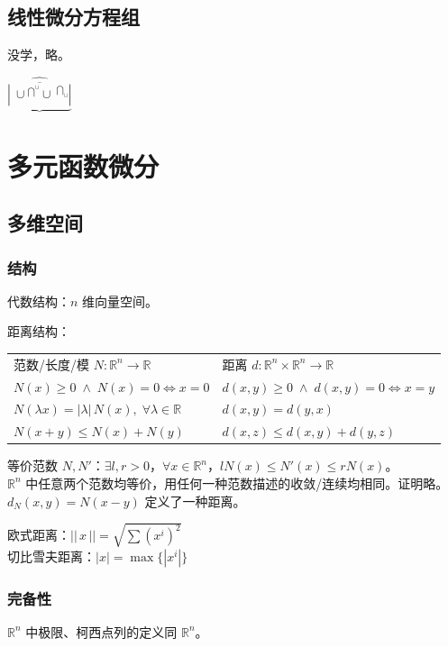 \documentclass[12pt, a4paper, UTF8, openany]{ctexbook}
\newcommand{\field}[1]{\mathbb{#1}}%
\newcommand{\R}[1]{\field{R}^{#1}}
\newcommand{\len}[1]{||\, #1 \,||}%
\begin{document}
    \section{线性微分方程组}
    没学，略。

    $\underbrace
    {
        \widehat
        {
            \overline
            {
                \left|
                \stackrel {\ } {\ \cup}
                \stackrel {\bigcap ^ \cup} {}
                \stackrel {\ } {\cup ^ {\ }}
                \stackrel {\bigcap_\cup} {}
                \right|
            }
        }
    }$

    \chapter{多元函数微分}
    \section{多维空间}
        \subsection{结构}
        代数结构：$n$ 维向量空间。

        距离结构：
        \begin{longtable}[h]{*{2}{w{l}{9cm}}}
            范数/长度/模 $N: \R{n} \to \R{}$ & 
            距离 $d: \R{n} \times \R{n} \to \R{}$ \\
            $N(x) \geqslant 0 \;\land\; N(x) = 0 \iff x = 0$ & $d(x, y) \geqslant 0 \;\land\; d(x, y) = 0 \iff x = y$ \\
            $N(\lambda x) = |\lambda|\, N(x), \; \forall \lambda \in \R{}$ & $d(x, y) = d(y, x)$ \\
            $N(x + y) \leqslant N(x) + N(y)$ & $d(x, z) \leqslant d(x, y) + d(y, z)$
        \end{longtable}

        等价范数 $N, N'$：$\exists l, r > 0$，$\forall x \in \field{R}^n$，$lN(x) \leqslant N'(x) \leqslant rN(x)$。\\
        $\R{n}$ 中任意两个范数均等价，用任何一种范数描述的收敛/连续均相同。证明略。\\
        $d_N(x, y) = N(x - y)$ 定义了一种距离。

        欧式距离：$\len{x} = \sqrt{\sum (x^i)^2}$ \\
        切比雪夫距离：$|x| = \max\{|x^i|\}$

        \subsection{完备性}
        $\R{n}$ 中极限、柯西点列的定义同 $\R{n}$。
\end{document}
